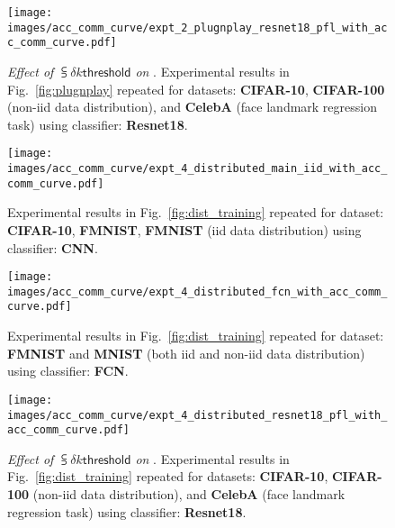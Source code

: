 \begin{figure}[t]
  \centering
    \centerline{\texttt{[image: images/acc\_comm\_curve/expt\_2\_plugnplay\_resnet18\_pfl\_with\_acc\_comm\_curve.pdf]}}
  \caption{\small{\textit{Effect of $\subsup{\delta}{k}{\mathsf{threshold}}$ on {\algName}}. Experimental results in Fig.~\ref{fig:plugnplay} repeated for datasets: \textbf{CIFAR-10}, \textbf{CIFAR-100} (non-iid data distribution), and \textbf{CelebA} (face landmark regression task) using classifier: \textbf{Resnet18}.}}
  \label{fig:plugnplay_resnet18}
\end{figure}



\begin{figure}[t]
  \centering
    \centerline{\texttt{[image: images/acc\_comm\_curve/expt\_4\_distributed\_main\_iid\_with\_acc\_comm\_curve.pdf]}}
  \caption{\small{Experimental results in Fig.~\ref{fig:dist_training} repeated for dataset: \textbf{CIFAR-10}, \textbf{FMNIST}, \textbf{FMNIST} (iid data distribution) using classifier: \textbf{CNN}.}}
  \label{fig:dist_training_cnn}
\end{figure}

\begin{figure}[t]
  \centering
    \centerline{\texttt{[image: images/acc\_comm\_curve/expt\_4\_distributed\_fcn\_with\_acc\_comm\_curve.pdf]}}
  \caption{\small{Experimental results in Fig.~\ref{fig:dist_training} repeated for dataset: \textbf{FMNIST} and \textbf{MNIST} (both iid and non-iid data distribution) using classifier: \textbf{FCN}.}}
  \label{fig:dist_training_fcn}
\end{figure}

\begin{figure}[t]
  \centering
    \centerline{\texttt{[image: images/acc\_comm\_curve/expt\_4\_distributed\_resnet18\_pfl\_with\_acc\_comm\_curve.pdf]}}
  \caption{\small{\textit{Effect of $\subsup{\delta}{k}{\mathsf{threshold}}$ on {\algName}}. Experimental results in Fig.~\ref{fig:dist_training} repeated for datasets: \textbf{CIFAR-10}, \textbf{CIFAR-100} (non-iid data distribution), and \textbf{CelebA} (face landmark regression task) using classifier: \textbf{Resnet18}.}}
  \label{fig:dist_training_resnet18}
\end{figure}


